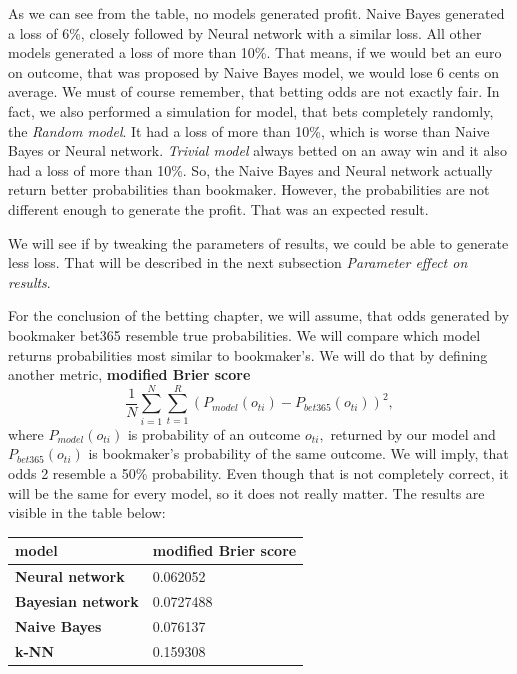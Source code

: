 \documentclass[conference]{IEEEtran}
\begin{document}
As we can see from the table, no models generated profit. Naive Bayes generated a loss of 6\%,
closely followed by Neural network with a similar loss.
All other models generated a loss of more than 10\%. That means, if we would bet an euro 
on outcome, that was proposed by Naive Bayes model, we would lose 6 cents on average. We must of course
remember, that betting odds are not exactly fair. In fact, we also performed a simulation for 
model, that bets completely randomly, the \textit{Random model}. It had a loss of more than 10\%,
which is worse than Naive Bayes or Neural network. \textit{Trivial model} always betted on an away win and it also 
had a loss of more than 10\%. So, the Naive Bayes and Neural network actually return better probabilities than 
bookmaker. However, the probabilities are not different enough to generate the profit. That was 
an expected result.

We will see if by tweaking the parameters of results, we could be able to generate less loss.
That will be described in the next subsection \textit{Parameter effect on results}.

For the conclusion of the betting chapter, we will assume, that odds generated by bookmaker
bet365 resemble true probabilities. We will compare which model returns probabilities most similar to
bookmaker's. We will do that by defining another metric, \textbf{modified Brier score}
$$\frac{1}{N} \sum_{i=1}^{N} \sum_{t=1}^{R} {(P_{model}(o_{ti}) - P_{bet365}(o_{ti}))^2},$$
where $P_{model}(o_{ti})$ is probability of an outcome $o_{ti},$ returned by our model and 
$P_{bet365}(o_{ti})$ is bookmaker's probability of the same outcome. We will imply, that 
odds 2 resemble a 50\% probability. Even though that is not completely correct, it will be 
the same for every model, so it does not really matter. The results are visible in the table
below:

\begin{table}[!ht]
    \centering
    \begin{tabular}{|l|l|}
    \hline
        \textbf{model} & modified Brier score \\ \hline
        \textbf{Neural network} & 0.062052 \\ \hline
        \textbf{Bayesian network} & 0.0727488 \\ \hline
        \textbf{Naive Bayes} & 0.076137 \\ \hline
        \textbf{k-NN} & 0.159308 \\ \hline
    \end{tabular}
\end{table}
\end{document}
